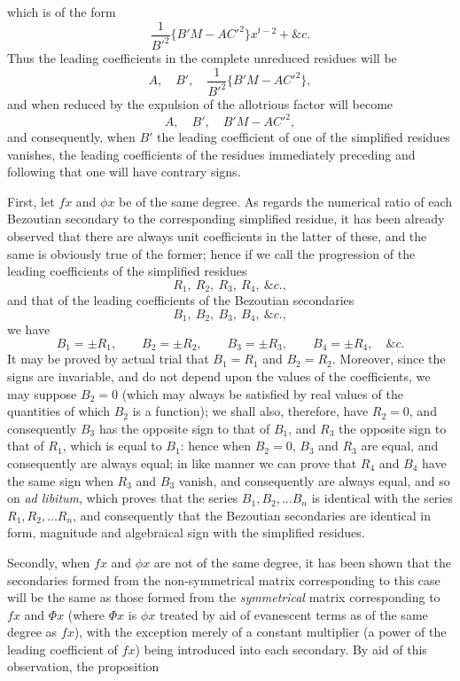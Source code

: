 \documentclass[11pt]{article}
\newcommand{\sourcepage}[1]{\marginpar{\scriptsize p.~#1}}
\begin{document}
\sourcepage{456}
which is of the form
\[
\frac1{B'^2}\{B'M-AC'^2\}x^{t-2}+\&c.
\]
Thus the leading coefficients in the complete unreduced residues will be
\[
A,\quad B',\quad \frac1{B'^2}\{B'M-AC'^2\},
\]
and when reduced by the expulsion of the allotrious factor will become
\[
A,\quad B',\quad B'M-AC'^2,
\]
and consequently, when $B'$ the leading coefficient of one of the simplified residues vanishes, the leading coefficients of the residues immediately preceding and following that one will have contrary signs.

First, let $fx$ and $\phi x$ be of the same degree. As regards the numerical ratio of each Bezoutian secondary to the corresponding simplified residue, it has been already observed that there are always unit coefficients in the latter of these, and the same is obviously true of the former; hence if we call the progression of the leading coefficients of the simplified residues
\[
R_1,\ R_2,\ R_3,\ R_4,\ \&c.,
\]
and that of the leading coefficients of the Bezoutian secondaries
\[
B_1,\ B_2,\ B_3,\ B_4,\ \&c.,
\]
we have
\[
B_1=\pm R_1,\qquad B_2=\pm R_2,\qquad B_3=\pm R_3,\qquad B_4=\pm R_4,\quad\&c.
\]
It may be proved by actual trial that $B_1=R_1$ and $B_2=R_2$. Moreover, since the signs are invariable, and do not depend upon the values of the coefficients, we may suppose $B_2=0$ (which may always be satisfied by real values of the quantities of which $B_2$ is a function); we shall also, therefore, have $R_2=0$, and consequently $B_3$ has the opposite sign to that of $B_1$, and $R_3$ the opposite sign to that of $R_1$, which is equal to $B_1$: hence when $B_2=0$, $B_3$ and $R_3$ are equal, and consequently are always equal; in like manner we can prove that $R_4$ and $B_4$ have the same sign when $R_3$ and $B_3$ vanish, and consequently are always equal, and so on \emph{ad libitum}, which proves that the series $B_1,B_2,\ldots B_n$ is identical with the series $R_1,R_2,\ldots R_n$, and consequently that the Bezoutian secondaries are identical in form, magnitude and algebraical sign with the simplified residues.

Secondly, when $fx$ and $\phi x$ are not of the same degree, it has been shown that the secondaries formed from the non-symmetrical matrix corresponding to this case will be the same as those formed from the \emph{symmetrical} matrix corresponding to $fx$ and $\Phi x$ (where $\Phi x$ is $\phi x$ treated by aid of evanescent terms as of the same degree as $fx$), with the exception merely of a constant multiplier (a power of the leading coefficient of $fx$) being introduced into each secondary. By aid of this observation, the proposition
\end{document}
